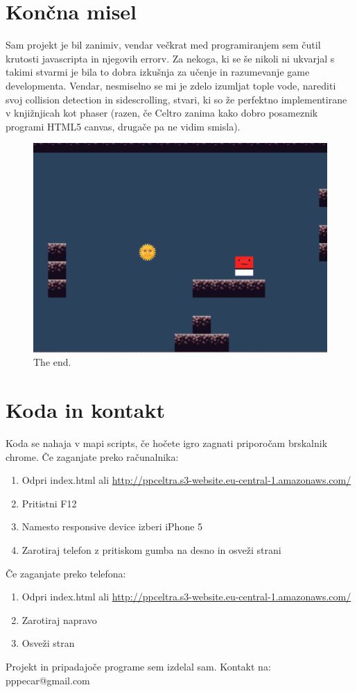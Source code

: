 \documentclass[a4paper,11pt]{article}
\begin{document}
\section{Končna misel}

Sam projekt je bil zanimiv, vendar večkrat med programiranjem sem čutil krutosti javascripta in njegovih errorv. Za nekoga, ki se še nikoli ni ukvarjal s takimi stvarmi je bila to dobra izkušnja za učenje in razumevanje game developmenta. Vendar, nesmiselno se mi je zdelo izumljat tople vode, narediti svoj collision detection in sidescrolling, stvari, ki so že perfektno implementirane v knjižnjicah kot phaser (razen, če Celtro zanima kako dobro posameznik programi HTML5 canvas, drugače pa ne vidim smisla).

\begin{figure}[htbp]
	\begin{center}
		\includegraphics[scale=0.4]{thegame.png}
		\caption{The end.}
		\label{game_scr}
	\end{center}
\end{figure}
\pagebreak

\section{Koda in kontakt}

Koda se nahaja v mapi scripts, če hočete igro zagnati priporočam brskalnik chrome. Če zaganjate preko računalnika:
\begin{enumerate}
	\item Odpri index.html ali \url{http://ppceltra.s3-website.eu-central-1.amazonaws.com/}
	\item Pritistni F12
	\item Namesto responsive device izberi iPhone 5
	\item Zarotiraj telefon z pritiskom gumba na desno in osveži strani
\end{enumerate}

Če zaganjate preko telefona:
\begin{enumerate}
	\item Odpri index.html ali \url{http://ppceltra.s3-website.eu-central-1.amazonaws.com/}
	\item Zarotiraj napravo
	\item Osveži stran
\end{enumerate}

Projekt in pripadajoče programe sem izdelal sam. Kontakt na: pppecar@gmail.com
\end{document}
